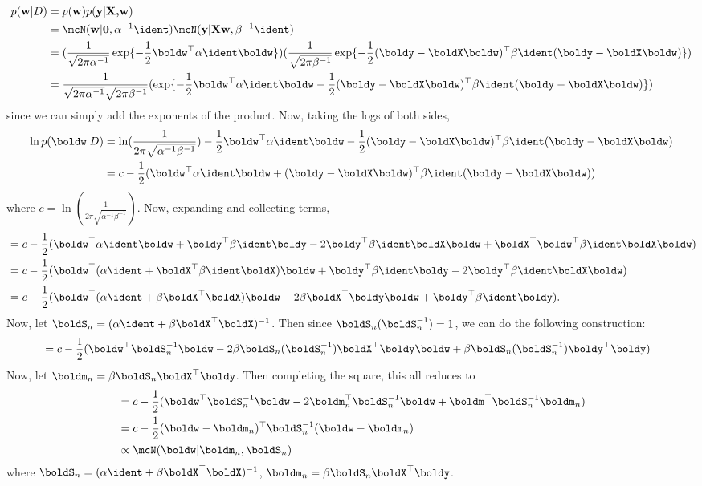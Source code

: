 \documentclass[submit]{harvardml}
\begin{document}
\begin{align*}
p(\textbf{w}| D) &= p(\textbf{w})p(\textbf{y}| \textbf{X,w})\\
&= \mcN(\textbf{w}|\textbf{0},\alpha^{-1} \ident) \mcN (\textbf{y}|\textbf{Xw},\beta^{-1}\ident)\\
&= (\frac{1}{\sqrt{2\pi \alpha^{-1}} } \exp \{ -\frac{1}{2} \boldw ^\top \alpha \ident \boldw \} ) (\frac{1}{\sqrt{2\pi \beta^{-1} } } \exp \{-\frac{1}{2} (\boldy - \boldX\boldw)^\top \beta \ident (\boldy - \boldX\boldw) \} ) \\ 
&= \frac{1}{ \sqrt{2\pi \alpha^{-1}} \sqrt{2\pi \beta^{-1}}} ( \exp \{  -\frac{1}{2} \boldw ^\top \alpha \ident \boldw  -\frac{1}{2} (\boldy - \boldX\boldw)^\top \beta \ident (\boldy - \boldX\boldw) \} )
\end{align*}
since we can simply add the exponents of the product. Now, taking the logs of both sides,
\begin{align*}
\ln p(\boldw | D) &= \ln(\frac{1}{2\pi \sqrt{\alpha^{-1} \beta^{-1}}} ) -\frac{1}{2} \boldw ^\top \alpha \ident \boldw  -\frac{1}{2} (\boldy - \boldX\boldw)^\top \beta \ident (\boldy - \boldX\boldw) \\
&= c - \frac{1}{2}( \boldw ^\top \alpha \ident \boldw +(\boldy - \boldX\boldw)^\top \beta \ident (\boldy - \boldX\boldw))
\end{align*}
where $c = \ln(\frac{1}{2\pi \sqrt{\alpha^{-1} \beta^{-1}}} )$. Now, expanding and collecting terms,
\begin{align*}
&= c - \frac{1}{2} (\boldw^\top \alpha\ident \boldw + \boldy^\top \beta\ident \boldy - 2\boldy^\top \beta\ident\boldX\boldw + \boldX^\top \boldw^\top \beta\ident \boldX\boldw) \\
&= c - \frac{1}{2}(\boldw^\top(\alpha \ident + \boldX^\top \beta \ident \boldX) \boldw + \boldy^\top \beta\ident \boldy -  2\boldy^\top \beta\ident\boldX\boldw) \\
&= c- \frac{1}{2}(\boldw^\top(\alpha \ident + \beta \boldX^\top \boldX) \boldw - 2\beta \boldX^\top\boldy \boldw + \boldy^\top \beta\ident \boldy).
\end{align*}
Now, let $\boldS_n = (\alpha \ident + \beta\boldX^\top\boldX)^{-1}$. Then since $\boldS_n(\boldS_n^{-1}) = 1$, we can do the following construction:
\begin{align*}
&= c- \frac{1}{2}(\boldw^\top \boldS_n^{-1} \boldw - 2\beta \boldS_n (\boldS_n^{-1}) \boldX^\top \boldy \boldw + \beta \boldS_n(\boldS_n^{-1})\boldy^\top \boldy)
\end{align*}
Now, let $\boldm_n = \beta \boldS_n\boldX^\top \boldy$. Then completing the square, this all reduces to 
\begin{align*}
&= c- \frac{1}{2}(\boldw^\top \boldS_n^{-1}\boldw - 2\boldm_n^\top \boldS_n^{-1}\boldw + \boldm^\top \boldS_n^{-1}\boldm_n) \\
&= c - \frac{1}{2}(\boldw -\boldm_n)^\top \boldS_n^{-1}(\boldw - \boldm_n)\\
&\propto \mcN(\boldw | \boldm_n, \boldS_n)
\end{align*}
where $\boldS_n = (\alpha \ident + \beta\boldX^\top\boldX)^{-1}$, $\boldm_n = \beta \boldS_n\boldX^\top \boldy$.
\end{document}
